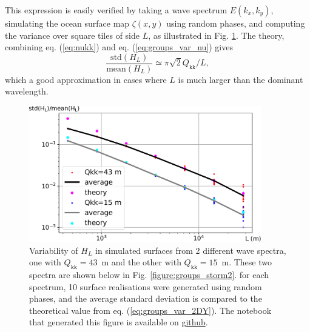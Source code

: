 {This expression is easily verified by taking a wave spectrum $E(k_x,k_y)$, simulating the ocean surface map $\zeta(x,y)$ using random phases, and computing the variance over square tiles of side $L$, as illustrated in Fig. \ref{fig:groups_maps}. The theory, combining eq. (\ref{eq:nukk}) and eq. (\ref{eq:groups_var_nu}) gives 
\begin{equation} 
 \frac{\mathrm{std}(H_L)}{\mathrm{mean}(H_L)} \simeq \pi \sqrt{2}  Q_{\mathrm{kk}} /  L,
   \label{eq:groups_var_2DY}
\end{equation}
which a good approximation in cases where $L$ is much larger than the dominant wavelength. 
\begin{figure}[htb]
\centerline{\includegraphics[width=0.9\textwidth]{FIGS_CH_GROUPS/std_maps.pdf}}
  \caption{Variability of $H_L$ in simulated surfaces from 2 different wave spectra, one with $Q_{\mathrm{kk}}=43$~m and the other with $Q_{\mathrm{kk}}=15$~m. These two spectra are shown below in Fig. \ref{figure:groups_storm2}. for each spectrum, 10 surface realisations were generated using random phases, and the average standard deviation is compared to the 
  theoretical value from eq. (\ref{eq:groups_var_2DY}). The notebook that generated this figure is available on \href{https://github.com/ardhuin/waves_in_geosciences/blob/main/NOTEBOOKS/chapter_groups_figure_Qkk_stdH_2D_maps.ipynb}{github}.}
\label{fig:groups_maps}
\end{figure}


}

